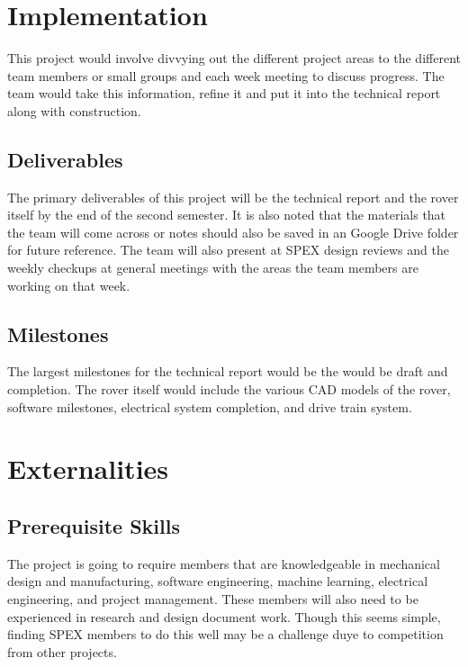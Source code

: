\documentclass[conference]{IEEEtran} %
\begin{document}
\section{Implementation}
\label{sec:implementation}

This project would involve divvying out the different project areas to the different team members or small groups and each week meeting to discuss progress. 
The team would take this information, refine it and put it into the technical report along with construction.  

\subsection{Deliverables}
\label{subsec:deliverables}
The primary deliverables of this project will be the technical report and the rover itself by the end of the second semester. 
It is also noted that the materials that the team will come across or notes should also be saved in an Google Drive folder for future reference.  
The team will also present at SPEX design reviews and the weekly checkups at general meetings with the areas the team members are working on that week.

\subsection{Milestones}
\label{subsec:milestones}
The largest milestones for the technical report would be the would be draft and completion. 
The rover itself would include the various CAD models of the rover, software milestones, electrical system completion, and drive train system. 

\section{Externalities}
\subsection{Prerequisite Skills}
The project is going to require members that are knowledgeable in mechanical design and manufacturing, software engineering, machine learning, electrical engineering, and project management. These members will also need to be experienced in research and design document work. Though this seems simple, finding SPEX members to do this well may be a challenge duye to competition from other projects. 
\end{document}
